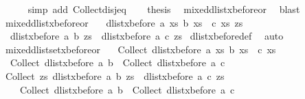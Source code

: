 \begin{isabellebody}
\ \ \ \ \isamarkupfalse%
\ {\isacharparenleft}simp\ add{\isacharcolon}\ Collect{\isacharunderscore}disj{\isacharunderscore}eq{\isacharparenright}\isanewline
\ \ \isamarkupfalse%
\ {\isacharquery}thesis\ \isamarkupfalse%
\ mixed{\isacharunderscore}dlist{\isacharunderscore}xbefore{\isacharunderscore}or{}\ \isamarkupfalse%
\ blast\isanewline
{}\isamarkupfalse%
%
\endisatagproof
{\isafoldproof}%
%
\isadelimproof
\isanewline
%
\endisadelimproof
\ \isanewline
{}\isamarkupfalse%
\ mixed{\isacharunderscore}dlist{\isacharunderscore}xbefore{\isacharunderscore}or{}{\isacharcolon}\ {\isachardoublequoteopen}\isanewline
\ \ dlist{\isacharunderscore}xbefore\ a\ {\isacharparenleft}{\isasymlambda}xs{\isachardot}\ b\ xs\ {\isasymor}\ c\ xs{\isacharparenright}\ zs\ {\isacharequal}\isanewline
\ \ {\isacharparenleft}{\isacharparenleft}dlist{\isacharunderscore}xbefore\ a\ b\ zs{\isacharparenright}\ {\isasymor}\ {\isacharparenleft}dlist{\isacharunderscore}xbefore\ a\ c\ zs{\isacharparenright}{\isacharparenright}{\isachardoublequoteclose}\isanewline
%
\isadelimproof
%
\endisadelimproof
%
\isatagproof
{}\isamarkupfalse%
\ dlist{\isacharunderscore}xbefore{\isacharunderscore}def\ \isamarkupfalse%
\ auto%
\endisatagproof
{\isafoldproof}%
%
\isadelimproof
\isanewline
%
\endisadelimproof
\isanewline
{}\isamarkupfalse%
\ mixed{\isacharunderscore}dlistset{\isacharunderscore}xbefore{\isacharunderscore}or{}{\isacharcolon}\ {\isachardoublequoteopen}\isanewline
\ \ Collect\ {\isacharparenleft}dlist{\isacharunderscore}xbefore\ a\ {\isacharparenleft}{\isasymlambda}xs{\isachardot}\ b\ xs\ {\isasymor}\ c\ xs{\isacharparenright}{\isacharparenright}\ {\isacharequal}\isanewline
\ \ Collect\ {\isacharparenleft}dlist{\isacharunderscore}xbefore\ a\ b{\isacharparenright}\ {\isasymunion}\ Collect\ {\isacharparenleft}dlist{\isacharunderscore}xbefore\ a\ c{\isacharparenright}{\isachardoublequoteclose}\isanewline
%
\isadelimproof
%
\endisadelimproof
%
\isatagproof
{}\isamarkupfalse%
{\isacharminus}\isanewline
\ \ \isamarkupfalse%
\ {\isachardoublequoteopen}Collect\ {\isacharparenleft}{\isasymlambda}zs{\isachardot}\ {\isacharparenleft}dlist{\isacharunderscore}xbefore\ a\ b\ zs{\isacharparenright}\ {\isasymor}\ {\isacharparenleft}dlist{\isacharunderscore}xbefore\ a\ c\ zs{\isacharparenright}{\isacharparenright}\ {\isacharequal}\isanewline
\ \ \ \ Collect\ {\isacharparenleft}dlist{\isacharunderscore}xbefore\ a\ b{\isacharparenright}\ {\isasymunion}\ Collect\ {\isacharparenleft}dlist{\isacharunderscore}xbefore\ a\ c{\isacharparenright}{\isachardoublequoteclose}\isanewline

\end{isabellebody}
